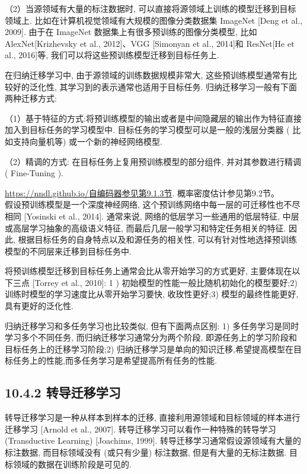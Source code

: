 \documentclass[10pt]{article}
\begin{document}
（2）当源领域有大量的标注数据时, 可以直接将源领域上训练的模型迁移到目标领域上. 比如在计算机视觉领域有大规模的图像分类数据集 ImageNet [Deng et al., 2009]. 由于在 ImageNet 数据集上有很多预训练的图像分类模型, 比如 AlexNet[Krizhevsky et al., 2012]、VGG [Simonyan et al., 2014]和 ResNet[He et al., 2016]等, 我们可以将这些预训练模型迁移到目标任务上.

在归纳迁移学习中, 由于源领域的训练数据规模非常大, 这些预训练模型通常有比较好的泛化性, 其学习到的表示通常也适用于目标任务. 归纳迁移学习一般有下面两种迁移方式:

（1）基于特征的方式:将预训练模型的输出或者是中间隐藏层的输出作为特征直接加入到目标任务的学习模型中. 目标任务的学习模型可以是一般的浅层分类器 ( 比如支持向量机等) 或一个新的神经网络模型.

（2）精调的方式: 在目标任务上复用预训练模型的部分组件, 并对其参数进行精调 ( Fine-Tuning ).

\href{https://nndl.github.io/%E8%87%AA%E7%BC%96%E7%A0%81%E5%99%A8%E5%8F%82%E8%A7%81%E7%AC%AC9.1.3%E8%8A%82}{https://nndl.github.io/自编码器参见第9.1.3节}. 概率密度估计参见第9.2节。\\
假设预训练模型是一个深度神经网络, 这个预训练网络中每一层的可迁移性也不尽相同 [Yosinski et al., 2014]. 通常来说, 网络的低层学习一些通用的低层特征, 中层或高层学习抽象的高级语义特征, 而最后几层一般学习和特定任务相关的特征. 因此, 根据目标任务的自身特点以及和源任务的相关性, 可以有针对性地选择预训练模型的不同层来迁移到目标任务中.

将预训练模型迁移到目标任务上通常会比从零开始学习的方式更好, 主要体现在以下三点 [Torrey et al., 2010]: 1 ) 初始模型的性能一般比随机初始化的模型要好;2) 训练时模型的学习速度比从零开始学习要快, 收玫性更好;3) 模型的最终性能更好,具有更好的泛化性.

归纳迁移学习和多任务学习也比较类似, 但有下面两点区别: 1) 多任务学习是同时学习多个不同任务, 而归纳迁移学习通常分为两个阶段, 即源任务上的学习阶段和目标任务上的迁移学习阶段;2) 归纳迁移学习是单向的知识迁移,希望提高模型在目标任务上的性能,而多任务学习是希望提高所有任务的性能.

\subsection*{10.4.2 转导迁移学习}
转导迁移学习是一种从样本到样本的迁移, 直接利用源领域和目标领域的样本进行迁移学习 [Arnold et al., 2007]. 转导迁移学习可以看作一种特殊的转导学习 (Transductive Learning) [Joachims, 1999]. 转导迁移学习通常假设源领域有大量的标注数据, 而目标领域没有 (或只有少量) 标注数据, 但是有大量的无标注数据. 目标领域的数据在训练阶段是可见的.
\end{document}
